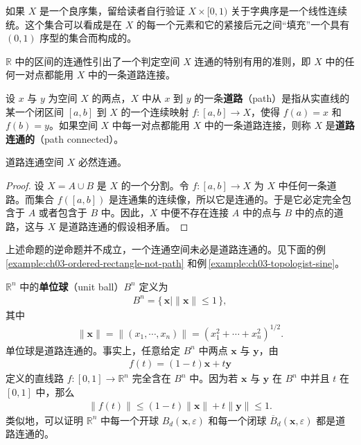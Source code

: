\begin{example}\label{example:ch03-well-ordered-product}
如果 $X$ 是一个良序集，留给读者自行验证 $X\times[0,1)$ 关于字典序是一个线性连续统。这个集合可以看成是在 $X$ 的每一个元素和它的紧接后元之间``填充''一个具有 $(0,1)$ 序型的集合而构成的。
\end{example}

$\mathbb{R}$ 中的区间的连通性引出了一个判定空间 $X$ 连通的特别有用的准则，即 $X$ 中的任何一对点都能用 $X$ 中的一条道路连接。

\begin{definition}\label{definition:ch03-path}
设 $x$ 与 $y$ 为空间 $X$ 的两点，$X$ 中从 $x$ 到 $y$ 的一条\textbf{道路}（path）是指从实直线的某一个闭区间 $[a,b]$ 到 $X$ 的一个连续映射 $f\colon[a,b]\to X$，使得 $f(a)=x$ 和 $f(b)=y$。如果空间 $X$ 中每一对点都能用 $X$ 中的一条道路连接，则称 $X$ 是\textbf{道路连通的}（path connected）。
\end{definition}

\begin{proposition}\label{proposition:ch03-path-connected-implies-connected}
道路连通空间 $X$ 必然连通。
\end{proposition}

\begin{proof}
设 $X=A\cup B$ 是 $X$ 的一个分割。令 $f\colon[a,b]\to X$ 为 $X$ 中任何一条道路。而集合 $f([a,b])$ 是连通集的连续像，所以它是连通的。于是它必定完全包含于 $A$ 或者包含于 $B$ 中。因此，$X$ 中便不存在连接 $A$ 中的点与 $B$ 中的点的道路，这与 $X$ 是道路连通的假设相矛盾。
\end{proof}

上述命题的逆命题并不成立，一个连通空间未必是道路连通的。见下面的例\,\cref{example:ch03-ordered-rectangle-not-path} 和例\,\cref{example:ch03-topologist-sine}。

\begin{example}\label{example:ch03-unit-ball}
$\mathbb{R}^{n}$ 中的\textbf{单位球}（unit ball）$B^{n}$ 定义为
\begin{align*}
B^{n}=\{\,\boldsymbol{x}\mid\|\boldsymbol{x}\|\leqslant 1\,\},
\end{align*}
其中
\begin{align*}
\|\boldsymbol{x}\|=\|(x_{1},\cdots,x_{n})\|=(x_{1}^{2}+\cdots+x_{n}^{2})^{1/2}.
\end{align*}
单位球是道路连通的。事实上，任意给定 $B^{n}$ 中两点 $\boldsymbol{x}$ 与 $\boldsymbol{y}$，由
\begin{align*}
f(t)=(1-t)\boldsymbol{x}+t\boldsymbol{y}
\end{align*}
定义的直线路 $f\colon[0,1]\to\mathbb{R}^{n}$ 完全含在 $B^{n}$ 中。因为若 $\boldsymbol{x}$ 与 $\boldsymbol{y}$ 在 $B^{n}$ 中并且 $t$ 在 $[0,1]$ 中，那么
\begin{align*}
\|f(t)\|\leqslant(1-t)\|\boldsymbol{x}\|+t\|\boldsymbol{y}\|\leqslant 1.
\end{align*}
类似地，可以证明 $\mathbb{R}^{n}$ 中每一个开球 $B_{d}(\boldsymbol{x},\varepsilon)$ 和每一个闭球 $\overline{B}_{d}(\boldsymbol{x},\varepsilon)$ 都是道路连通的。
\end{example}

